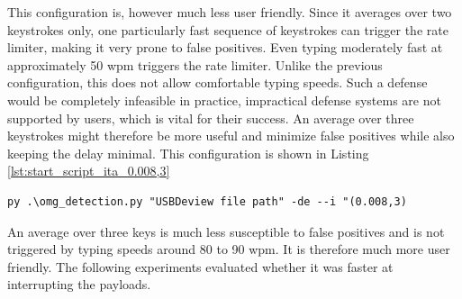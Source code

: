 This configuration is, however much less user friendly. Since it averages over two keystrokes only, one particularly fast sequence of keystrokes can trigger the rate limiter, making it very prone to false positives. Even typing moderately fast at approximately 50 wpm triggers the rate limiter. Unlike the previous configuration, this does not allow comfortable typing speeds. Such a defense would be completely infeasible in practice, impractical defense systems are not supported by users, which is vital for their success. An average over three keystrokes might therefore be more useful and minimize false positives while also keeping the delay minimal. This configuration is shown in Listing  \ref{lst:start_script_ita_0.008,3}   
\begin{lstlisting}[caption={start Defense Script with ITA (0.02,2)},label={lst:start_script_ita_0.008,3}, captionpos=b]
 py .\omg_detection.py "USBDeview file path" -de --i "(0.008,3)
\end{lstlisting}

An average over three keys is much less susceptible to false positives and is not triggered by typing speeds around 80 to 90 wpm. It is therefore much more user friendly. The following experiments evaluated whether it was faster at interrupting the payloads. 


